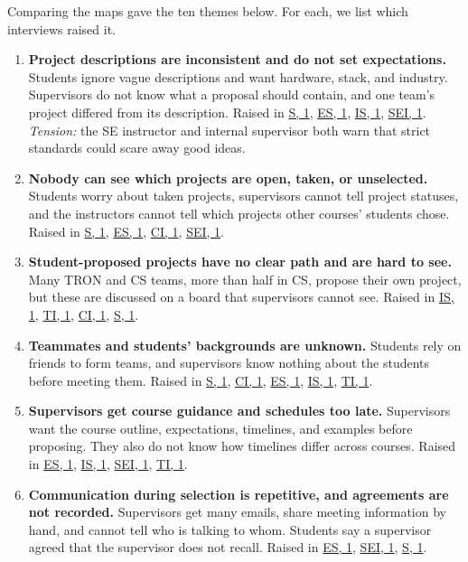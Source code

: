 \documentclass{article}
\newcommand{\intlink}[3]{\hyperref[int:#1-#2]{#3}}
\newcommand{\intref}[2]{\intlink{#1}{#2}{#1, #2}}
\begin{document}
    Comparing the maps gave the ten themes below. For each, we list which interviews raised it.

    \begin{enumerate}
        \item \textbf{Project descriptions are inconsistent and do not set expectations.}
        Students ignore vague descriptions and want hardware, stack, and industry. Supervisors do not
        know what a proposal should contain, and one team's project differed from its description.
        Raised in \intref{S}{1}, \intref{ES}{1}, \intref{IS}{1}, \intref{SEI}{1}.
        \textit{Tension:} the SE instructor and internal supervisor both warn that
        strict standards could scare away good ideas.

        \item \textbf{Nobody can see which projects are open, taken, or unselected.}
        Students worry about taken projects, supervisors cannot tell project statuses, and the instructors cannot
        tell which projects other courses' students chose. Raised in \intref{S}{1}, \intref{ES}{1},
        \intref{CI}{1}, \intref{SEI}{1}.

        \item \textbf{Student-proposed projects have no clear path and are hard to see.}
        Many TRON and CS teams, more than half in CS, propose their own project, but these are
        discussed on a board that supervisors cannot see. Raised in \intref{IS}{1}, \intref{TI}{1},
        \intref{CI}{1}, \intref{S}{1}.

        \item \textbf{Teammates and students' backgrounds are unknown.}
        Students rely on friends to form teams, and supervisors know nothing about the students
        before meeting them. Raised in \intref{S}{1}, \intref{CI}{1}, \intref{ES}{1}, \intref{IS}{1},
        \intref{TI}{1}.

        \item \textbf{Supervisors get course guidance and schedules too late.}
        Supervisors want the course outline, expectations, timelines, and examples before proposing. They also
        do not know how timelines differ across courses. Raised in \intref{ES}{1}, \intref{IS}{1},
        \intref{SEI}{1}, \intref{TI}{1}.

        \item \textbf{Communication during selection is repetitive, and agreements are not recorded.}
        Supervisors get many emails, share meeting information by hand, and cannot tell who is talking to
        whom. Students say a supervisor agreed that the supervisor does not recall. Raised in
        \intref{ES}{1}, \intref{SEI}{1}, \intref{S}{1}.


\end{enumerate}
\end{document}
